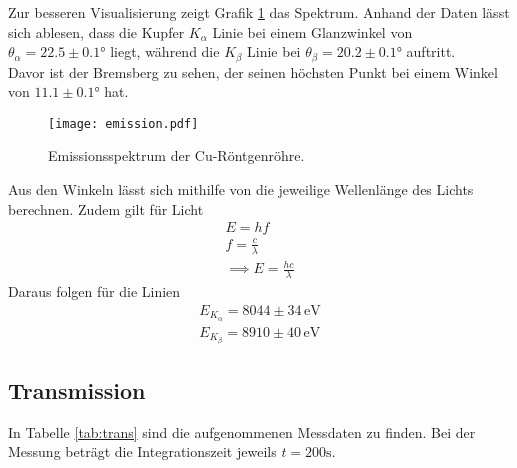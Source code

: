 Zur besseren Visualisierung zeigt Grafik \ref{fig:emission}
das Spektrum. Anhand der Daten lässt sich ablesen, dass die Kupfer 
$K_\alpha$ Linie bei einem Glanzwinkel von $\theta_\alpha = 22.5 \pm 0.1°$ liegt,
während die $K_\beta$ Linie bei $\theta_\beta = 20.2 \pm 0.1 °$ auftritt.\\
Davor ist der Bremsberg zu sehen, der seinen höchsten Punkt bei einem
Winkel von $11.1 \pm 0.1°$ hat. 

\begin{figure}
    \centering
    \texttt{[image: emission.pdf]}
    \caption{Emissionsspektrum der Cu-Röntgenröhre.}
    \label{fig:emission}
\end{figure}

\noindent Aus den Winkeln lässt sich mithilfe von %
die jeweilige Wellenlänge des Lichts berechnen. Zudem gilt für Licht
\begin{align*}
    E = h f \\
    f = \frac{c}{\lambda}\\
    \implies E = \frac{h c}{\lambda}
\end{align*}
Daraus folgen für die Linien
\begin{align*}
    E_{K_\alpha} = 8044 \pm 34 \, \mathrm{eV}\\
    E_{K_\beta} = 8910 \pm 40 \, \mathrm{eV}
\end{align*}

\subsection{Transmission}

In Tabelle \ref{tab:trans} sind die aufgenommenen Messdaten zu finden. Bei 
der Messung beträgt die Integrationszeit jeweils $t = 200 \si{\s}$.


